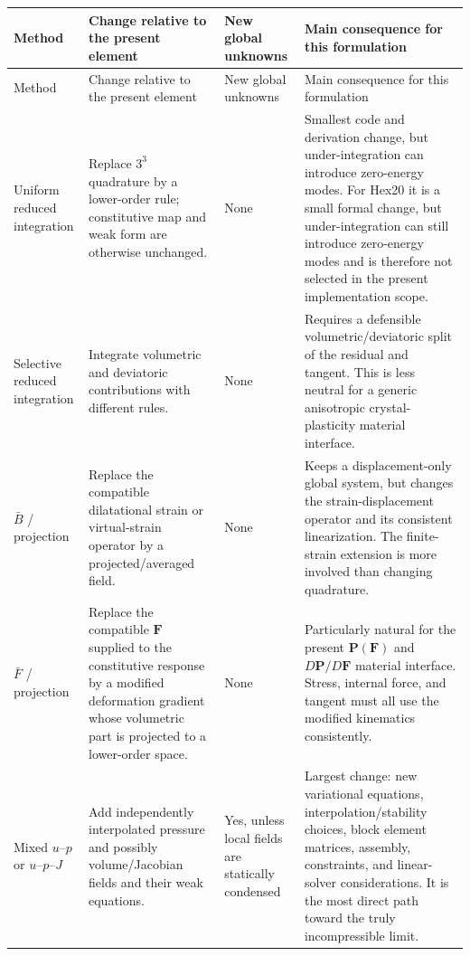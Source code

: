 \documentclass[11pt,a4paper]{article}
\newcommand{\bs}[1]{\boldsymbol{#1}}
\newcommand{\F}{\bs{F}}
\newcommand{\Pstress}{\bs{P}}
\begin{document}
{\small
\setlength{\tabcolsep}{4pt}
\begin{longtable}{>{\raggedright\arraybackslash}p{2.5cm} >{\raggedright\arraybackslash}p{3.8cm} >{\raggedright\arraybackslash}p{2.8cm} >{\raggedright\arraybackslash}p{4.4cm}}
\toprule
Method & Change relative to the present element & New global unknowns & Main consequence for this formulation \\
\midrule
\endfirsthead
\toprule
Method & Change relative to the present element & New global unknowns & Main consequence for this formulation \\
\midrule
\endhead
Uniform reduced integration & Replace $3^3$ quadrature by a lower-order rule; constitutive map and weak form are otherwise unchanged. & None & Smallest code and derivation change, but under-integration can introduce zero-energy modes. For Hex20 it is a small formal change, but under-integration can still introduce zero-energy modes and is therefore not selected in the present implementation scope. \\
\addlinespace
Selective reduced integration & Integrate volumetric and deviatoric contributions with different rules. & None & Requires a defensible volumetric/deviatoric split of the residual and tangent. This is less neutral for a generic anisotropic crystal-plasticity material interface. \\
\addlinespace
$\bar B$ / projection & Replace the compatible dilatational strain or virtual-strain operator by a projected/averaged field. & None & Keeps a displacement-only global system, but changes the strain-displacement operator and its consistent linearization. The finite-strain extension is more involved than changing quadrature. \\
\addlinespace
$\bar F$ / projection & Replace the compatible $\F$ supplied to the constitutive response by a modified deformation gradient whose volumetric part is projected to a lower-order space. & None & Particularly natural for the present $\Pstress(\F)$ and $D\Pstress/D\F$ material interface. Stress, internal force, and tangent must all use the modified kinematics consistently. \\
\addlinespace
Mixed $u$--$p$ or $u$--$p$--$J$ & Add independently interpolated pressure and possibly volume/Jacobian fields and their weak equations. & Yes, unless local fields are statically condensed & Largest change: new variational equations, interpolation/stability choices, block element matrices, assembly, constraints, and linear-solver considerations. It is the most direct path toward the truly incompressible limit. \\
\bottomrule
\end{longtable}
}
\end{document}
